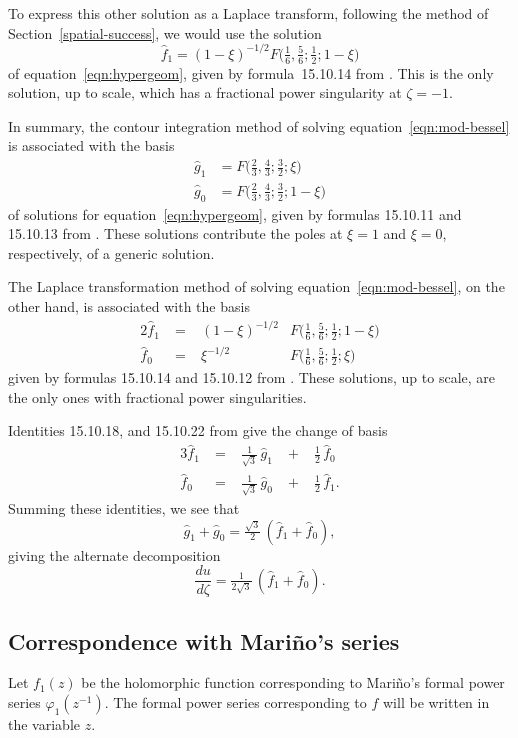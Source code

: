 \documentclass{article}
\theoremstyle{plain}
\begin{document}
To express this other solution as a Laplace transform, following the method of Section~\ref{spatial-success}, we would use the solution
\[ \hat{f}_1 = (1-\xi)^{-1/2} F\big(\tfrac{1}{6}, \tfrac{5}{6}; \tfrac{1}{2}; 1-\xi\big) \]
of equation~\ref{eqn:hypergeom}, given by formula~15.10.14 from \cite{dlmf}. This is the only solution, up to scale, which has a fractional power singularity at $\zeta = -1$.

In summary, the contour integration method of solving equation~\ref{eqn:mod-bessel} is associated with the basis
\begin{align*}
\hat{g}_1 & = F\big(\tfrac{2}{3}, \tfrac{4}{3}; \tfrac{3}{2}; \xi\big) \\
\hat{g}_0 & = F\big(\tfrac{2}{3}, \tfrac{4}{3}; \tfrac{3}{2}; 1-\xi\big)
\end{align*}
of solutions for equation~\ref{eqn:hypergeom}, given by formulas 15.10.11 and 15.10.13 from \cite{dlmf}. These solutions contribute the poles at $\xi = 1$ and $\xi = 0$, respectively, of a generic solution.

The Laplace transformation method of solving equation~\ref{eqn:mod-bessel}, on the other hand, is associated with the basis
\begin{alignat*}{2}
\hat{f}_1 &\;=\;& (1-\xi)^{-1/2} & F\big(\tfrac{1}{6}, \tfrac{5}{6}; \tfrac{1}{2}; 1-\xi\big) \\
\hat{f}_0 &\;=\:& \xi^{-1/2} & F\big(\tfrac{1}{6}, \tfrac{5}{6}; \tfrac{1}{2}; \xi\big)
\end{alignat*}
given by formulas 15.10.14 and 15.10.12 from \cite{dlmf}. These solutions, up to scale, are the only ones with fractional power singularities.

Identities 15.10.18, and 15.10.22 from \cite{dlmf} give the change of basis
\begin{alignat*}{3}
\hat{f}_1 &\;=\;&\tfrac{1}{\sqrt{3}}\,\hat{g}_1 &\;+\;& \tfrac{1}{2}\,\hat{f}_0 \\
\hat{f}_0 &\;=\;& \tfrac{1}{\sqrt{3}}\,\hat{g}_0 &\;+\;& \tfrac{1}{2}\,\hat{f}_1.
\end{alignat*}
Summing these identities, we see that
\[ \hat{g}_1 + \hat{g}_0 = \tfrac{\sqrt{3}}{2}\,(\hat{f}_1 + \hat{f}_0), \]
giving the alternate decomposition
\[ \frac{du}{d\zeta} = \tfrac{1}{2\sqrt{3}}\,(\hat{f}_1 + \hat{f}_0). \]
\subsection{Correspondence with Mari\~{n}o's series}
Let $f_1(z)$ be the holomorphic function corresponding to Mari\~{n}o's formal power series $\varphi_1(z^{-1})$. The formal power series corresponding to $f$ will be written in the variable $z$.
\end{document}
